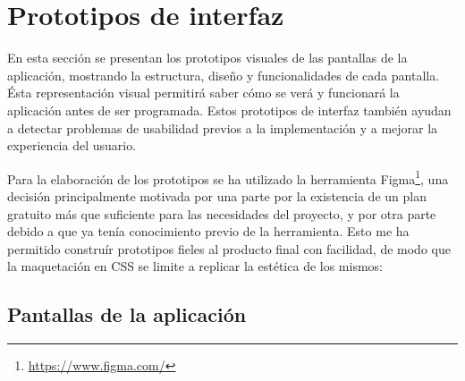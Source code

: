 
\section{Prototipos de interfaz}\label{sec:prototipos-interfaz}
En esta sección se presentan los prototipos visuales de las pantallas de la aplicación, mostrando la estructura, diseño y funcionalidades de cada pantalla. Ésta representación visual permitirá saber cómo se verá y funcionará la aplicación antes de ser programada. Estos prototipos de interfaz también ayudan a detectar problemas de usabilidad previos a la implementación y a mejorar la experiencia del usuario.

Para la elaboración de los prototipos se ha utilizado la herramienta Figma\footnote{\url{https://www.figma.com/}}, una decisión principalmente motivada por una parte por la existencia de un plan gratuito más que suficiente para las necesidades del proyecto, y por otra parte debido a que ya tenía conocimiento previo de la herramienta. Esto me ha permitido construír prototipos fieles al producto final con facilidad, de modo que la maquetación en CSS se limite a replicar la estética de los mismos:

\subsection{Pantallas de la aplicación}

